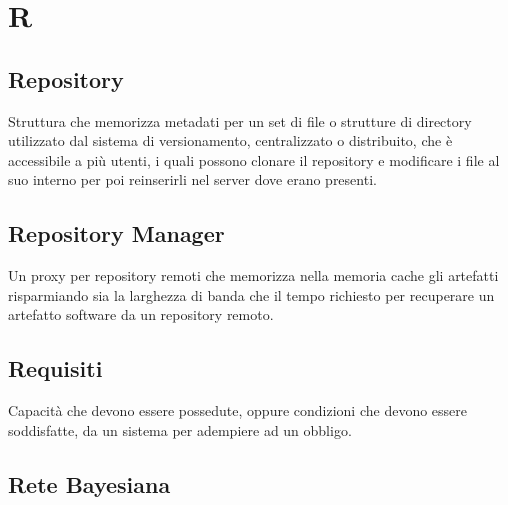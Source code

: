 \section*{R}

\subsection{Repository}
Struttura che memorizza metadati per un set di file o strutture di directory utilizzato dal sistema di versionamento, centralizzato o distribuito, che è accessibile a più utenti, i quali possono clonare il repository e modificare i file al suo interno per poi reinserirli nel server dove erano presenti.

\subsection{Repository Manager}
Un proxy per repository remoti che memorizza nella memoria cache gli artefatti risparmiando sia la larghezza di banda che il tempo richiesto per recuperare un artefatto software da un repository remoto.

\subsection{Requisiti}
Capacità che devono essere possedute, oppure condizioni che devono essere soddisfatte, da un sistema per adempiere ad un obbligo.

\subsection{Rete Bayesiana}